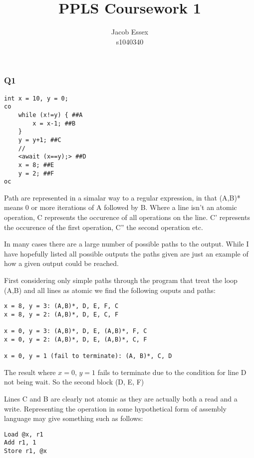 \documentclass[11pt,a4paper]{article}
\begin{document}
\title{PPLS Coursework 1}
\author{Jacob Essex\\s1040340}
\date{}
\maketitle

\subsubsection*{Q1}

\begin{verbatim}
int x = 10, y = 0;
co
    while (x!=y) { ##A
        x = x-1; ##B
    }
    y = y+1; ##C
    //
    <await (x==y);> ##D
    x = 8; ##E
    y = 2; ##F
oc
\end{verbatim}

Path are represented in a simalar way to a regular expression, in that (A,B)* means 0
or more iterations of A followed by B. Where a line isn't an atomic
operation, C represents the occurence of all operations on the line. C' represents the occurence
of the first operation, C'' the second operation etc.

In many cases there are a large number of possible paths to the output.
While I have hopefully listed all possible outputs the paths given are
just an example of how a given output could be reached.

First considering only simple paths through the program that treat the
loop (A,B) and all lines as atomic we find the following ouputs and
paths:

\begin{verbatim}
x = 8, y = 3: (A,B)*, D, E, F, C
x = 8, y = 2: (A,B)*, D, E, C, F

x = 0, y = 3: (A,B)*, D, E, (A,B)*, F, C
x = 0, y = 2: (A,B)*, D, E, (A,B)*, C, F

x = 0, y = 1 (fail to terminate): (A, B)*, C, D
\end{verbatim}

The result where $x = 0$, $y = 1$ fails to terminate due to the condition
for line D not being wait. So the second block (D, E, F)

Lines C and B are clearly not atomic as they are actually both a read
and a write. Representing the operation in some hypothetical form of assembly language
may give something such as follows:

\begin{verbatim}
Load @x, r1
Add r1, 1
Store r1, @x
\end{verbatim}
\end{document}
